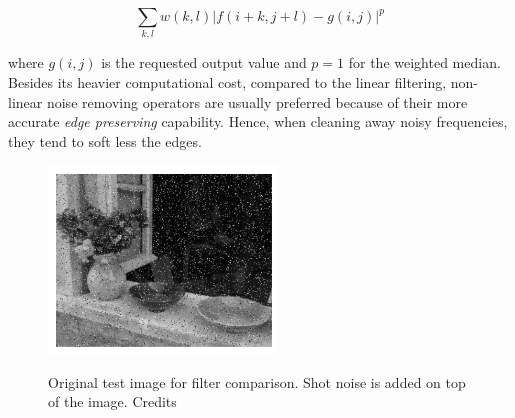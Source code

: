\begin{equation}
	\label{eqn:weighted-median-filt}
	\sum_{k, l} w(k,l) \vert f(i + k, j + l) - g(i, j) \vert^{p}
\end{equation}

where $g(i,j)$ is the requested output value and $p = 1$ for the weighted median. \\
Besides its heavier computational cost, compared to the linear filtering, non-linear noise removing operators are usually preferred because of their more accurate \textit{edge preserving} capability. 
Hence, when cleaning away noisy frequencies, they tend to soft less the edges.\\

\begin{figure}[t]
	\begin{center}
		{\includegraphics[width=.8\textwidth, height= 5cm, keepaspectratio]{images/filter-example-original-shot-noise.png}}
\caption{Original test image for filter comparison. Shot noise is added on top of the image. Credits \cite{Szeliski2011}}
\label{fig:filter-example-original}
	\end{center}
\end{figure}

